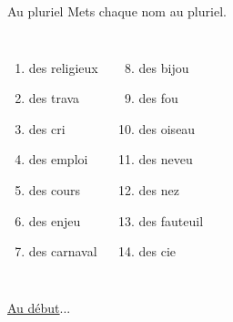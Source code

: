 \begin{frame}{Au pluriel}
  Mets chaque nom au pluriel.
  \vspace{0.25cm}
  \begin{columns}
      \begin{enumerate}
        \item des religieux\underline{}
        \item des trava\underline{}
        \item des cri\underline{\uncover<4->{s\ \ }}
        \item des emploi\underline{}
        \item des cours\underline{}
        \item des enjeu\underline{}
        \item des carnaval\underline{}
      \end{enumerate}
      \begin{enumerate}
        \setcounter{enumi}{7}
        \item des bijou\underline{}
        \item des fou\underline{}
        \item des oiseau\underline{\uncover<11->{x\ \ }}
        \item des neveu\underline{}
        \item des nez\underline{}
        \item des fauteuil\underline{}
        \item des cie\underline{}
      \end{enumerate}
  \end{columns}
  \vspace{0.25cm}
  \raggedleft\hyperlink{début}{Au début}...
\end{frame}